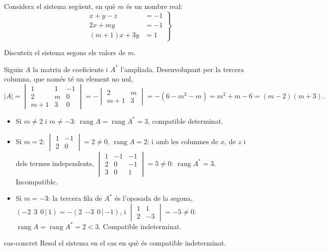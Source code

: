 Considera el sistema següent, en què $m$ és un nombre real:
\[
\left.\begin{aligned}
x+y-z&=-1\\
2x+my&=-1\\
(m+1)x+3y&=1
\end{aligned}\right\}
\]

\begin{apartats}

Discuteix el sistema segons els valors de $m$.

\begin{solucio}
Siguin $A$ la matriu de coeficients i $A^*$ l'ampliada. Desenvolupant per la tercera columna, que només
té un element no nul,
\[
|A|=\begin{vmatrix}1&1&-1\\2&m&0\\m+1&3&0\end{vmatrix}
=-\begin{vmatrix}2&m\\m+1&3\end{vmatrix}=-(6-m^2-m)=m^2+m-6=(m-2)(m+3).
\]
\begin{itemize}
\item Si $m\ne2$ i $m\ne-3$: $\operatorname{rang}A=\operatorname{rang}A^*=3$, compatible determinat.
\item Si $m=2$: $\begin{vmatrix}1&-1\\2&0\end{vmatrix}=2\ne0$, $\operatorname{rang}A=2$; i amb les columnes
de $x$, de $z$ i dels termes independents, $\begin{vmatrix}1&-1&-1\\2&0&-1\\3&0&1\end{vmatrix}=5\ne0$:
$\operatorname{rang}A^*=3$. Incompatible.
\item Si $m=-3$: la tercera fila de $A^*$ és l'oposada de la segona, $(-2\ \ 3\ \ 0\,|\,1)=-(2\ \ {-3}\ \ 0\,|\,{-1})$,
i $\begin{vmatrix}1&1\\2&-3\end{vmatrix}=-5\ne0$: $\operatorname{rang}A=\operatorname{rang}A^*=2<3$.
Compatible indeterminat.
\end{itemize}
\end{solucio}

\begin{tria}{cas-concret}
Resol el sistema en el cas en què és compatible indeterminat.


\end{tria}
\end{apartats}
